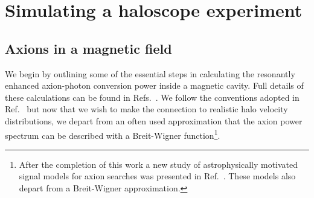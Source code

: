 \section{Simulating a haloscope experiment}\label{sec:axions_background}

\subsection{Axions in a magnetic field}\label{sec:axions_theory}
We begin by outlining some of the essential steps in calculating the resonantly enhanced axion-photon conversion power inside a magnetic cavity. Full details of these calculations can be found in Refs.~\cite{Hong:2014vua,McAllister:2015zcz,Krauss:1985ub}. We follow the conventions adopted in Ref.~\cite{Hong:2014vua} but now that we wish to make the connection to realistic halo velocity distributions, we depart from an often used approximation that the axion power spectrum can be described with a Breit-Wigner function\footnote{After the completion of this work a new study of astrophysically motivated signal models for axion searches was presented in Ref.~\cite{Lentz:2017aay}. These models also depart from a Breit-Wigner approximation.}.

